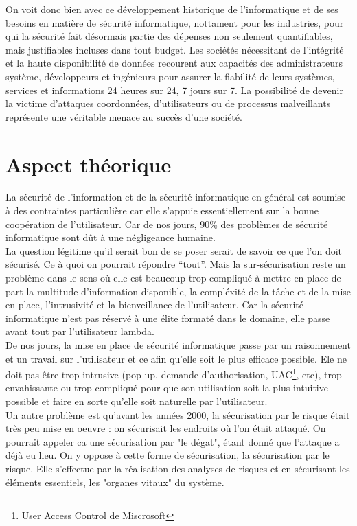 \documentclass[a4paper]{memoir}
\begin{document}
On voit donc bien avec ce développement historique de l'informatique et de ses besoins en matière de sécurité informatique, nottament pour les industries, pour qui la sécurité fait désormais partie des dépenses non seulement quantifiables, mais justifiables incluses dans tout budget. Les sociétés nécessitant de l'intégrité et la haute disponibilité de données recourent aux capacités des administrateurs système, développeurs et ingénieurs pour assurer la fiabilité de leurs systèmes, services et informations 24 heures sur 24, 7 jours sur 7. La possibilité de devenir la victime d'attaques coordonnées, d'utilisateurs ou de processus malveillants représente une véritable menace au succès d'une société. 

\chapter{Aspect théorique}
 

La sécurité de l'information et de la sécurité informatique en général est soumise à des contraintes particulière car elle s'appuie essentiellement sur la bonne coopération de l'utilisateur. Car de nos jours, 90\% des problèmes de sécurité informatique sont dût à une négligeance humaine.\\
La question légitime qu'il serait bon de se poser serait de savoir ce que l'on doit sécurisé. Ce à quoi on pourrait répondre ``tout''. Mais la sur-sécurisation reste un problème dans le sens où elle est beaucoup trop compliqué à mettre en place de part la multitude d'information disponible, la compléxité de la tâche et de la mise en place, l'intrusivité et la bienveillance de l'utilisateur. Car la sécurité informatique n'est pas réservé à une élite formaté dans le domaine, elle passe avant tout par l'utilisateur lambda.\\
De nos jours, la mise en place de sécurité informatique passe par un raisonnement et un travail sur l'utilisateur et ce afin qu'elle soit le plus efficace possible. Ele ne doit pas être trop intrusive (pop-up, demande d'authorisation, UAC\footnote{User Access Control de Miscrosoft}, etc), trop envahissante ou trop compliqué pour que son utilisation soit la plus intuitive possible et faire en sorte qu'elle soit naturelle par l'utilisateur.\\

Un autre problème est qu'avant les années 2000, la sécurisation par le risque était très peu mise en oeuvre : on sécurisait les endroits où l'on était attaqué. On pourrait appeler ca une sécurisation par "le dégat", étant donné que l'attaque a déjà eu lieu.
On y oppose à cette forme de sécurisation, la sécurisation par le risque. Elle s'effectue par la réalisation des analyses de risques et en sécurisant les éléments essentiels, les "organes vitaux" du système.
\end{document}

